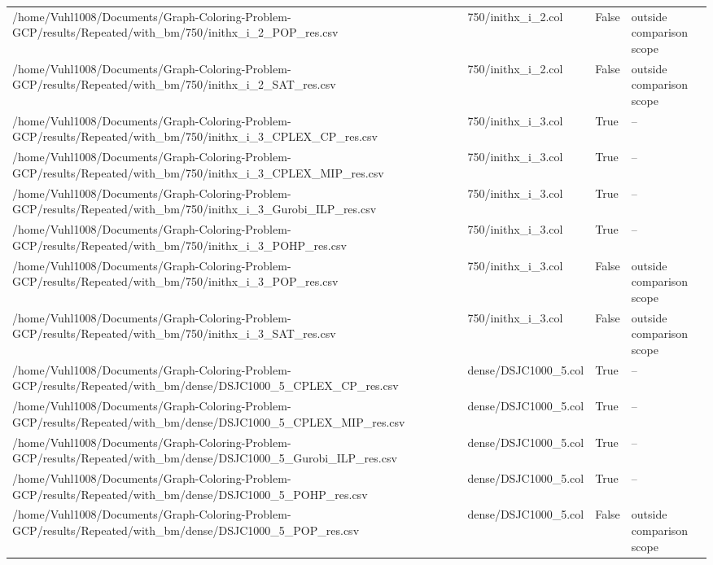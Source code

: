 \begin{table}[htbp]
\begin{tabular}{llll}
/home/Vuhl1008/Documents/Graph-Coloring-Problem-GCP/results/Repeated/with\_bm/750/inithx\_i\_2\_POP\_res.csv & 750/inithx\_i\_2.col & False & outside comparison scope \\
/home/Vuhl1008/Documents/Graph-Coloring-Problem-GCP/results/Repeated/with\_bm/750/inithx\_i\_2\_SAT\_res.csv & 750/inithx\_i\_2.col & False & outside comparison scope \\
/home/Vuhl1008/Documents/Graph-Coloring-Problem-GCP/results/Repeated/with\_bm/750/inithx\_i\_3\_CPLEX\_CP\_res.csv & 750/inithx\_i\_3.col & True & -- \\
/home/Vuhl1008/Documents/Graph-Coloring-Problem-GCP/results/Repeated/with\_bm/750/inithx\_i\_3\_CPLEX\_MIP\_res.csv & 750/inithx\_i\_3.col & True & -- \\
/home/Vuhl1008/Documents/Graph-Coloring-Problem-GCP/results/Repeated/with\_bm/750/inithx\_i\_3\_Gurobi\_ILP\_res.csv & 750/inithx\_i\_3.col & True & -- \\
/home/Vuhl1008/Documents/Graph-Coloring-Problem-GCP/results/Repeated/with\_bm/750/inithx\_i\_3\_POHP\_res.csv & 750/inithx\_i\_3.col & True & -- \\
/home/Vuhl1008/Documents/Graph-Coloring-Problem-GCP/results/Repeated/with\_bm/750/inithx\_i\_3\_POP\_res.csv & 750/inithx\_i\_3.col & False & outside comparison scope \\
/home/Vuhl1008/Documents/Graph-Coloring-Problem-GCP/results/Repeated/with\_bm/750/inithx\_i\_3\_SAT\_res.csv & 750/inithx\_i\_3.col & False & outside comparison scope \\
/home/Vuhl1008/Documents/Graph-Coloring-Problem-GCP/results/Repeated/with\_bm/dense/DSJC1000\_5\_CPLEX\_CP\_res.csv & dense/DSJC1000\_5.col & True & -- \\
/home/Vuhl1008/Documents/Graph-Coloring-Problem-GCP/results/Repeated/with\_bm/dense/DSJC1000\_5\_CPLEX\_MIP\_res.csv & dense/DSJC1000\_5.col & True & -- \\
/home/Vuhl1008/Documents/Graph-Coloring-Problem-GCP/results/Repeated/with\_bm/dense/DSJC1000\_5\_Gurobi\_ILP\_res.csv & dense/DSJC1000\_5.col & True & -- \\
/home/Vuhl1008/Documents/Graph-Coloring-Problem-GCP/results/Repeated/with\_bm/dense/DSJC1000\_5\_POHP\_res.csv & dense/DSJC1000\_5.col & True & -- \\
/home/Vuhl1008/Documents/Graph-Coloring-Problem-GCP/results/Repeated/with\_bm/dense/DSJC1000\_5\_POP\_res.csv & dense/DSJC1000\_5.col & False & outside comparison scope \\

\end{tabular}
\end{table}
